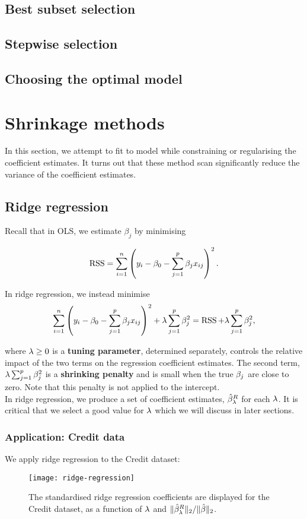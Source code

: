 \documentclass{report}
\newcommand{\gbh}{\hat{\gb}}
\DeclareMathOperator{\RSS}{RSS}
\begin{document}
	\subsection{Best subset selection}
	\subsection{Stepwise selection}
	\subsection{Choosing the optimal model}
	\pagebreak
	\section{Shrinkage methods}
	In this section, we attempt to fit to model while constraining or regularising the coefficient estimates. It turns out that these method scan significantly reduce the variance of the coefficient estimates.
	
	\subsection{Ridge regression}
	Recall that in OLS, we estimate $\beta_j$ by minimising
	
	$$\RSS=\sum_{i=1}^{n}\lt(y_i-\beta_0-\sum_{j=1}^{p}\gb_j x_{ij}\rt)^2.$$
	
	In ridge regression, we instead minimise
	$$\sum_{i=1}^{n}\lt(y_i-\gb_0-\sum_{j=1}^{p}\gb_jx_{ij}\rt)^2+\lm\sum_{j=1}^{p}\gb_j^2=\RSS+\lm\sum_{j=1}^{p}\gb_j^2,$$
	
	where $\lambda\geq 0$ is a \textbf{tuning parameter}, determined separately, controls the relative impact of the two terms on the regression coefficient estimates. The second term, $\lambda\sum_{j=1}^{p}\beta_j^2$ is a \textbf{shrinking penalty} and is small when the true $\beta_j$ are close to zero. Note that this penalty is not applied to the intercept.\\
	
	In ridge regression, we produce a set of coefficient estimates, $\gbh_{\lm}^R$ for each $\lambda$. It is critical that we select a good value for $\lambda$ which we will discuss in later sections. 
	
	\subsubsection{Application: Credit data}
	We apply ridge regression to the Credit dataset:\\
	\begin{figure}[h]
		\centering
		\texttt{[image: ridge-regression]}
		\caption{The standardised ridge regression coefficients are displayed for the Credit dataset, as a function of $\lambda$ and $\|\gbh_{\lm}^R\|_2/\|\gbh\|_2$.}
		\label{fig:ridge-regression}
	\end{figure}
	
\end{document}
